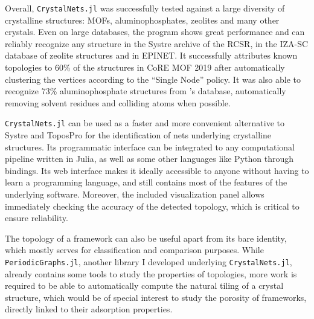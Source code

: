 \documentclass[main.tex]{subfiles}
\begin{document}
Overall, \texttt{CrystalNets.jl} was successfully tested against a large diversity of crystalline structures: MOFs, aluminophosphates, zeolites and many other crystals. Even on large databases, the program shows great performance and can reliably recognize any structure in the Systre archive of the RCSR, in the IZA-SC database of zeolite structures and in EPINET. It successfully attributes known topologies to {60\%} of the structures in CoRE MOF 2019 after automatically clustering the vertices according to the ``Single Node'' policy. It was also able to recognize {73\%} aluminophosphate structures from \textcite{ALPO}'s database, automatically removing solvent residues and colliding atoms when possible.

\texttt{CrystalNets.jl} can be used as a faster and more convenient alternative to Systre and ToposPro for the identification of nets underlying crystalline structures. Its programmatic interface can be integrated to any computational pipeline written in Julia, as well as some other languages like Python through bindings. %
Its web interface makes it ideally accessible to anyone without having to learn a programming language, and still contains most of the features of the underlying software. Moreover, the included visualization panel allows immediately checking the accuracy of the detected topology, which is critical to ensure reliability.

The topology of a framework can also be useful apart from its bare identity, which mostly serves for classification and comparison purposes. While \texttt{PeriodicGraphs.jl}, another library I developed underlying \texttt{CrystalNets.jl}, already contains some tools to study the properties of topologies, more work is required to be able to automatically compute the natural tiling\autocite{Tiling} of a crystal structure, which would be of special interest to study the porosity of frameworks, directly linked to their adsorption properties.
\end{document}
